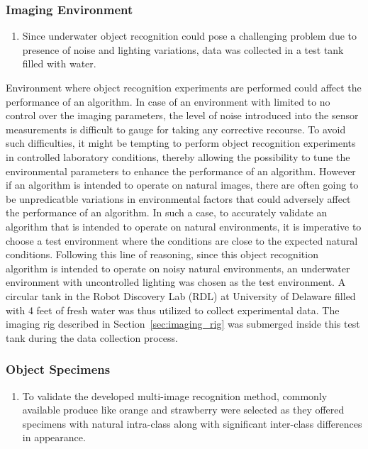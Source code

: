 \documentclass {udthesis}
\begin{document}
\subsubsection{Imaging Environment}


\begin{enumerate}
	\item Since underwater object recognition could pose a challenging problem due to presence of noise and lighting variations, data was collected in a test tank filled with water.
\end{enumerate}


Environment where object recognition experiments are performed could affect the performance of an algorithm. In case of an environment with limited to no control over the imaging parameters, the level of noise introduced into the sensor measurements is difficult to gauge for taking any corrective recourse. To avoid such difficulties, it might be tempting to perform object recognition experiments in controlled laboratory conditions, thereby allowing the possibility to tune the environmental parameters to enhance the performance of an algorithm. However if an algorithm is intended to operate on natural images, there are often going to be unpredicatble variations in environmental factors that could adversely affect the performance of an algorithm. In such a case, to accurately validate an algorithm that is intended to operate on natural environments, it is imperative to choose a 
test environment where the conditions are close to the expected natural conditions. Following this line of reasoning, since this object recognition algorithm is intended to operate on noisy natural environments, an underwater environment with uncontrolled lighting was chosen as the test environment. A circular tank in the Robot Discovery Lab (RDL) at University of Delaware filled with 4 feet of fresh water was thus utilized to collect experimental data. The imaging rig described in Section~\ref{sec:imaging_rig} was submerged inside this test tank during the data collection process.

\subsubsection{Object Specimens}


\begin{enumerate}
	\item To validate the developed multi-image recognition method, commonly available produce like orange and strawberry were selected as they offered specimens with natural intra-class along with significant inter-class differences in appearance.
\end{enumerate}
\end{document}
